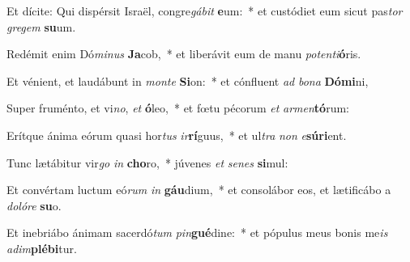 \item Et dícite: Qui dispérsit Israël, congre\textit{gá}\textit{bit} \textbf{e}um:~* et custódiet eum sicut pas\textit{tor} \textit{gre}\textit{gem} \textbf{su}um.
\item Redémit enim Dó\textit{mi}\textit{nus} \textbf{Ja}cob,~* et liberávit eum de manu \textit{pot}\textit{en}\textit{ti}\textbf{ó}ris.
\item Et vénient, et laudábunt in \textit{mon}\textit{te} \textbf{Si}on:~* et cónfluent \textit{ad} \textit{bo}\textit{na} \textbf{Dó}\textbf{mi}ni,
\item Super fruménto, et vi\textit{no}, \textit{et} \textbf{ó}leo,~* et fœtu pécorum \textit{et} \textit{ar}\textit{men}\textbf{tó}rum:
\item Erítque ánima eórum quasi hor\textit{tus} \textit{ir}\textbf{rí}guus,~* et ul\textit{tra} \textit{non} \textit{e}\textbf{sú}\textbf{ri}ent.
\item Tunc lætábitur vir\textit{go} \textit{in} \textbf{cho}ro,~* júvenes \textit{et} \textit{se}\textit{nes} \textbf{si}mul:
\item Et convértam luctum eó\textit{rum} \textit{in} \textbf{gáu}dium,~* et consolábor eos, et lætificábo a \textit{do}\textit{ló}\textit{re} \textbf{su}o.
\item Et inebriábo ánimam sacerdó\textit{tum} \textit{pin}\textbf{gué}dine:~* et pópulus meus bonis me\textit{is} \textit{ad}\textit{im}\textbf{plé}\textbf{bi}tur.
